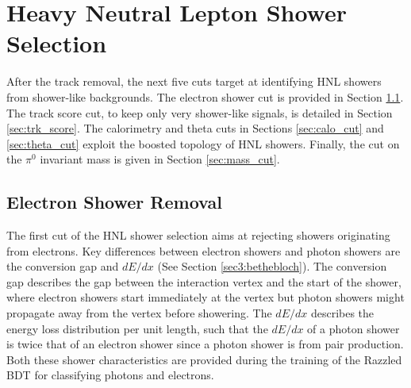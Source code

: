 \section{Heavy Neutral Lepton Shower Selection}
\label{sec:hnl_shower_select}

After the track removal, the next five cuts target at identifying HNL showers from shower-like backgrounds.
The electron shower cut is provided in Section \ref{sec:electron_removal}.
The track score cut, to keep only very shower-like signals, is detailed in Section \ref{sec:trk_score}.
The calorimetry and theta cuts in Sections \ref{sec:calo_cut} and \ref{sec:theta_cut} exploit the boosted topology of HNL showers.
Finally, the cut on the $\pi^0$ invariant mass is given in Section \ref{sec:mass_cut}.

\subsection{Electron Shower Removal}
\label{sec:electron_removal}


The first cut of the HNL shower selection aims at rejecting showers originating from electrons.
Key differences between electron showers and photon showers are the conversion gap and $dE/dx$ (See Section \ref{sec3:bethebloch}).
The conversion gap describes the gap between the interaction vertex and the start of the shower, where electron showers start immediately at the vertex but photon showers might propagate away from the vertex before showering. 
The $dE/dx$ describes the energy loss distribution per unit length, such that the $dE/dx$ of a photon shower is twice that of an electron shower since a photon shower is from pair production.
Both these shower characteristics are provided during the training of the Razzled BDT for classifying photons and electrons. 

